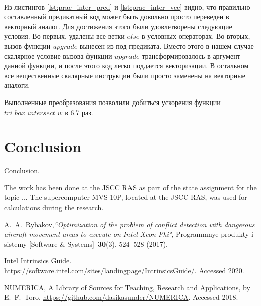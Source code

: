 \documentclass[
11pt,%
tightenlines,%
twoside,%
onecolumn,%
nofloats,%
nobibnotes,%
nofootinbib,%
superscriptaddress,%
noshowpacs,%
centertags]%
{revtex4}
\begin{document}
\ \\

Из листингов \ref{lst:prac_inter_pred} и \ref{lst:prac_inter_vec} видно, что правильно составленный предикатный код может быть довольно просто переведен в векторный аналог.
Для достижения этого были удовлетворены следующие условия.
Во-первых, удалены все ветки $else$ в условных операторах.
Во-вторых, вызов функции $upgrade$ вынесен из-под предиката.
Вместо этого в нашем случае скалярное условие вызова функции $upgrade$ трансформировалось в аргумент данной функции, и после этого код легко поддается векторизации.
В остальном все вещественные скалярные инструкции были просто заменены на векторные аналоги.

Выполненные преобразования позволили добиться ускорения функции \\
$tri\_box\_intersect\_w$ в 6.7 раз.

\section{Conclusion}

Conclusion.

\begin{acknowledgments}
The work has been done at the JSCC RAS as part of the state assignment for the topic ... The supercomputer MVS-10P, located at the JSCC RAS, was used for calculations during the research.
\end{acknowledgments}

\begin{thebibliography}{99}

A.~A.~Rybakov,{\it ``Optimization of the problem of conflict detection with dangerous aircraft movement areas to execute on Intel Xeon Phi"}, Programmnye produkty i sistemy [Software \& Systems]~{\bf 30}(3), 524--528 (2017).

Intel Intrinsics Guide. \url{https://software.intel.com/sites/landingpage/IntrinsicsGuide/}. Accessed 2020.

NUMERICA, A Library of Sources for Teaching, Research and Applications, by E.~F.~Toro. \url{https://github.com/dasikasunder/NUMERICA}. Accessed 2018.

\end{thebibliography}
\end{document}
